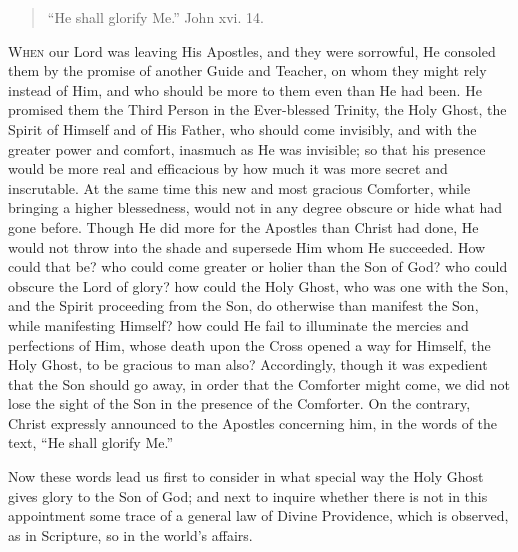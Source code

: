 
\begin{quote}

``He shall glorify Me.'' John xvi. 14.

\end{quote}

W\textsc{hen} our Lord was leaving His Apostles, and they were sorrowful, He
consoled them by the promise of another Guide and Teacher, on whom
they might rely instead of Him, and who should be more to them even
than He had been. He promised them the Third Person in the
Ever-blessed Trinity, the Holy Ghost, the Spirit of Himself and of His
Father, who should come invisibly, and with the greater power and
comfort, inasmuch as He was invisible; so that his presence would be
more real and efficacious by how much it was more secret and
inscrutable. At the same time this new and most gracious Comforter,
while bringing a higher blessedness, would not in any degree obscure
or hide what had gone before. Though He did more for the Apostles than
Christ had done, He would not throw into the shade and supersede Him
whom He succeeded. How could that be? who could come greater or holier
than the Son of God? who could obscure the Lord of glory? how could
the Holy Ghost, who was one with the Son, and the Spirit proceeding
from the Son, do otherwise than manifest the Son, while manifesting
Himself? how could He fail to illuminate the mercies and perfections
of Him, whose death upon the Cross opened a way for Himself, the Holy
Ghost, to be gracious to man also? Accordingly, though it was
expedient that the Son should go away, in order that the Comforter
might come, we did not lose the sight of the Son in the presence of
the Comforter. On the contrary, Christ expressly announced to the
Apostles concerning him, in the words of the text, ``He shall
glorify Me.''

Now these words lead us first to consider in what special way the
Holy Ghost gives glory to the Son of God; and next to inquire whether
there is not in this appointment some trace of a general law of Divine
Providence, which is observed, as in Scripture, so in the world's
affairs.

